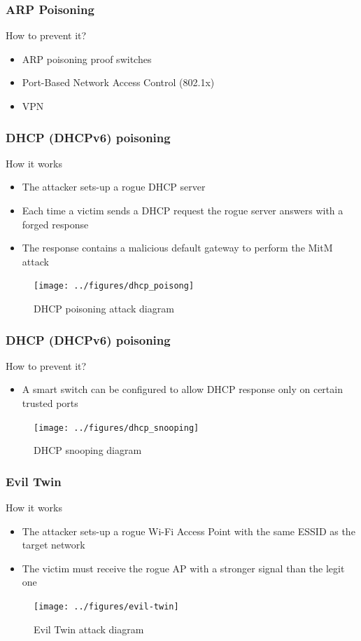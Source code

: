 \documentclass{beamer}
\begin{document}
\begin{frame}
  \frametitle{ARP Poisoning}
  \begin{block}{How to prevent it?}
  \pause
  \begin{itemize}
    \item ARP poisoning proof switches
    \item Port-Based Network Access Control (802.1x)
    \item VPN
  \end{itemize}
\end{block}
\end{frame}
\begin{frame}
  \frametitle{DHCP (DHCPv6) poisoning}
  \begin{block}{How it works}
  \begin{itemize}
    \item The attacker sets-up a rogue DHCP server
    \item Each time a victim sends a DHCP request the rogue server answers with a forged response
    \item The response contains a malicious default gateway to perform the MitM attack
  \end{itemize}
\end{block}
  \begin{figure}
  \texttt{[image: ../figures/dhcp\_poisong]}
  \caption*{DHCP poisoning attack diagram}
  \end{figure}
\end{frame}


\begin{frame}
  \frametitle{DHCP (DHCPv6) poisoning}
  \begin{block}{How to prevent it?}
  \pause
  \begin{itemize}
    \item A smart switch can be configured to allow DHCP response only on certain trusted ports
  \end{itemize}
\end{block}
  \begin{figure}
  \texttt{[image: ../figures/dhcp\_snooping]}
  \caption*{DHCP snooping diagram}
  \end{figure}
\end{frame}


\begin{frame}
  \frametitle{Evil Twin}
  \begin{block}{How it works}
  \begin{itemize}
    \item The attacker sets-up a rogue Wi-Fi Access Point with the same ESSID as the target network
    \item The victim must receive the rogue AP with a stronger signal than the legit one
  \end{itemize}
\end{block}
  \begin{figure}
    \texttt{[image: ../figures/evil-twin]}
    \caption*{Evil Twin attack diagram}
  \end{figure}
\end{frame}
\end{document}
